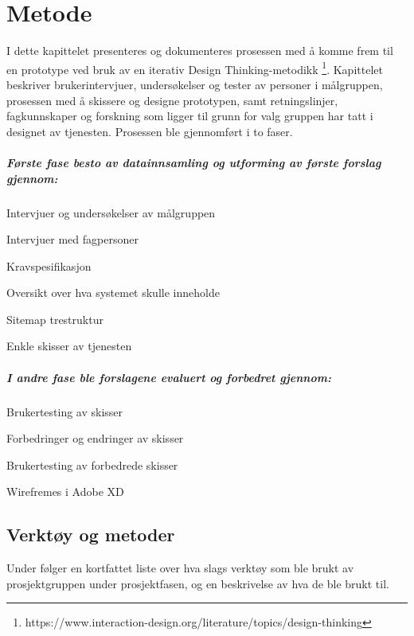 \cleardoublepage
\chapter{Metode}
\label{chap:method}

I dette kapittelet presenteres og dokumenteres prosessen med å komme frem til en prototype ved bruk av en iterativ Design Thinking-metodikk \footnote{https://www.interaction-design.org/literature/topics/design-thinking}. Kapittelet beskriver brukerintervjuer, undersøkelser og tester av personer i målgruppen, prosessen med å skissere og designe prototypen, samt retningslinjer, fagkunnskaper og forskning som ligger til grunn for valg gruppen har tatt i designet av tjenesten. Prosessen ble gjennomført i to faser.

\paragraph{Første fase besto av datainnsamling og utforming av første forslag gjennom:}
\begin{compactitem}
\item Intervjuer og undersøkelser av målgruppen
\item Intervjuer med fagpersoner
\item Kravspesifikasjon
\item Oversikt over hva systemet skulle inneholde
\item Sitemap trestruktur
\item Enkle skisser av tjenesten
\end{compactitem}

\paragraph{I andre fase ble forslagene evaluert og forbedret gjennom:}
\begin{compactitem}
\item Brukertesting av skisser
\item Forbedringer og endringer av skisser
\item Brukertesting av forbedrede skisser
\item Wirefremes i Adobe XD
\end{compactitem}

\newpage
\section{Verktøy og metoder}
Under følger en kortfattet liste over hva slags verktøy som ble brukt av prosjektgruppen under prosjektfasen, og en beskrivelse av hva de ble brukt til.

